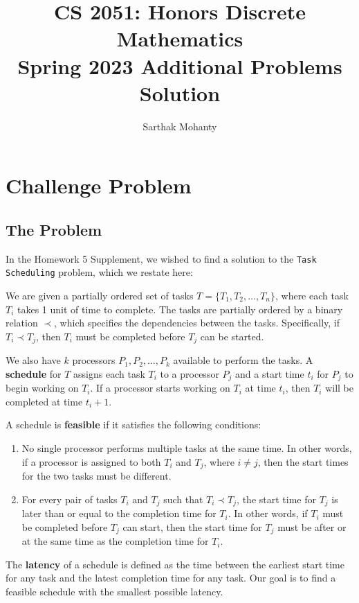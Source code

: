 \documentclass{article}
\title{\vspace{-1cm}CS 2051: Honors Discrete Mathematics \\Spring 2023 Additional Problems Solution}
\author{Sarthak Mohanty}
\date{}
\begin{document}
\maketitle

\section*{Challenge Problem}
    \subsection*{The Problem}
    In the Homework 5 Supplement, we wished to find a solution to the \texttt{Task} \texttt{Scheduling} problem, which we restate here:

    \begin{tcolorbox}[
    enhanced, colback={green!40!black}, colupper=white, colframe=brown!70!black,
    sharp corners,drop fuzzy shadow,
    underlay={\tcbvignette{size=2mm, inside node=frame, raised color=brown!70!black}}]
    {
        \vspace{2mm} We are given a partially ordered set of tasks $T = \{T_{1}, T_{2}, \dots, T_{n}\}$, where each task $T_{i}$ takes 1 unit of time to complete. The tasks are partially ordered by a binary relation $\prec$, which specifies the dependencies between the tasks. Specifically, if $T_{i} \prec T_{j}$, then $T_{i}$ must be completed before $T_{j}$ can be started.
    
        \vspace{3mm}
        We also have $k$ processors $P_{1}, P_{2}, \dots, P_{k}$ available to perform the tasks. A \textbf{schedule} for $T$ assigns each task $T_{i}$ to a processor $P_{j}$ and a start time $t_{i}$ for $P_{j}$ to begin working on $T_{i}$. If a processor starts working on $T_{i}$ at time $t_{i}$, then $T_{i}$ will be completed at time $t_{i} + 1$.
    
        \vspace{3mm} A schedule is \textbf{feasible} if it satisfies the following conditions:
        \begin{enumerate}[label = \arabic*]
            \item No single processor performs multiple tasks at the same time. In other words, if a processor is assigned to both $T_{i}$ and $T_{j}$, where $i \ne j$, then the start times for the two tasks must be different.
            \item For every pair of tasks $T_{i}$ and $T_{j}$ such that $T_{i} \prec T_{j}$, the start time for $T_{j}$ is later than or equal to the completion time for $T_{i}$. In other words, if $T_{i}$ must be completed before $T_{j}$ can start, then the start time for $T_{j}$ must be after or at the same time as the completion time for $T_{i}$.
        \end{enumerate}
        The \textbf{latency} of a schedule is defined as the time between the earliest start time for any task and the latest completion time for any task. Our goal is to find a feasible schedule with the smallest possible latency.
        }
    \end{tcolorbox}
    
\end{document}

